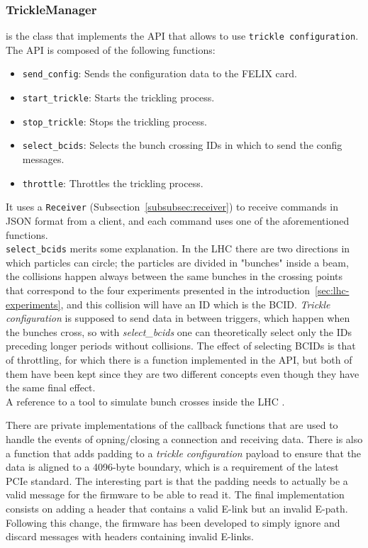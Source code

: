 \subsubsection{TrickleManager} is the class that implements the \acs{API} that allows to use \texttt{trickle configuration}. The \acs{API} is composed of the following functions:
\begin{itemize}
    \item \texttt{send\_config}: Sends the configuration data to the \acs{FELIX} card.
    \item \texttt{start\_trickle}: Starts the trickling process.
    \item \texttt{stop\_trickle}: Stops the trickling process.
    \item \texttt{select\_bcids}: Selects the bunch crossing IDs in which to send the config messages.
    \item \texttt{throttle}: Throttles the trickling process.
\end{itemize}

It uses a \texttt{Receiver} (Subsection~\ref{subsubsec:receiver}) to receive commands in JSON format from a client, and each command uses one of the aforementioned functions.\\

\texttt{select\_bcids} merits some explanation. In the \acl{LHC} there are two directions in which particles can circle; the particles are divided in "bunches" inside a beam, the collisions happen always between the same bunches in the crossing points that correspond to the four experiments presented in the introduction~\ref{sec:lhc-experiments}, and this collision will have an ID which is the \acl{BCID}. \emph{Trickle configuration} is supposed to send data in between triggers, which happen when the bunches cross, so with \emph{select\_bcids} one can theoretically select only the IDs preceding longer periods without collisions. The effect of selecting \acs{BCID}s is that of throttling, for which there is a function implemented in the \acs{API}, but both of them have been kept since they are two different concepts even though they have the same final effect.\\
A reference to a tool to simulate bunch crosses inside the \acs{LHC} \cite{bunch-crossing-tool}.

There are private implementations of the callback functions that are used to handle the events of opning/closing a connection and receiving data. There is also a function that adds padding to a \emph{trickle configuration} payload to ensure that the data is aligned to a 4096-byte boundary, which is a requirement of the latest \acs{PCIe} standard. The interesting part is that the padding needs to actually be a valid message for the firmware to be able to read it. The final implementation consists on adding a header that contains a valid \acs{E-link} but an invalid E-path. Following this change, the firmware has been developed to simply ignore and discard messages with headers containing invalid \acs{E-link}s.

